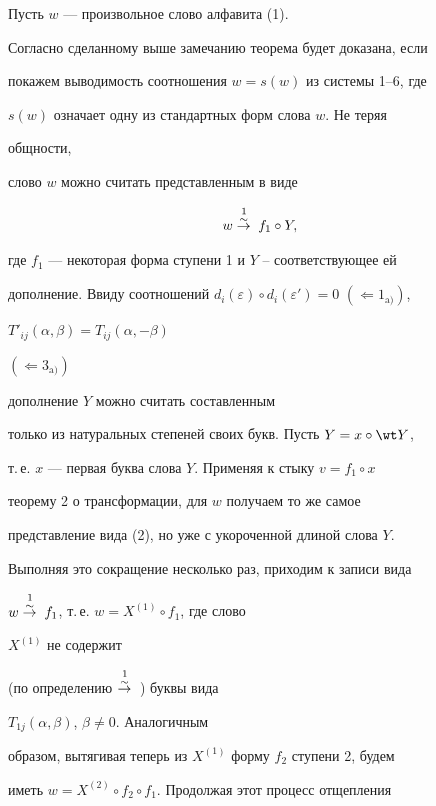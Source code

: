  


\begin{pf} 


Пусть $w$ --- произвольное слово алфавита (1). 


Согласно сделанному выше замечанию теорема будет доказана, если 


покажем выводимость соотношения $w=s(w)$ из системы 1--6, где 


$s(w)$ означает одну из стандартных форм слова $w$. Не теряя 


общности, 


слово $w$ можно считать представленным в виде 


\begin{equation} 


w\overset{1\;}{\simto}{}f_1\circ Y, 


\end{equation} 


где $f_1$ --- некоторая форма ступени 1 и $Y$ -- соответствующее ей 


дополнение. Ввиду соотношений $d_i(\varepsilon)\circ 


d_i(\varepsilon')=0$ $(\Leftarrow 1_{\mathrm a)})$, 


$T'_{ij}(\alpha,\beta)=T_{ij}(\alpha,-\beta)$ 


$(\Leftarrow 3_{\mathrm a)})$ 


дополнение $Y$ можно считать составленным 


только из натуральных степеней своих букв. Пусть $Y=x\circ\wt Y$, 


т.\,е. $x$ --- первая буква слова $Y$. Применяя к стыку $v=f_1\circ x$ 


теорему 2 о трансформации, для $w$ получаем то же самое 


представление вида (2), но уже с укороченной длиной слова $Y$. 


Выполняя это сокращение несколько раз, приходим к записи вида 


$w\overset{1\;}{\overset{\sim}{\to}{}}{}f_1$, т.\,е. $w=X^{(1)}\circ f_1$, где слово 


$X^{(1)}$ не содержит 


(по определению $\overset{1\;}{\overset{\sim}{\to}{}}{}$) буквы вида 


$T_{1j}(\alpha,\beta)$, $\beta\ne0$. Аналогичным 


образом, вытягивая теперь из $X^{(1)}$ форму $f_2$ ступени 2, будем 


иметь $w=X^{(2)}\circ f_2\circ f_1$. Продолжая этот процесс отщепления 



\end{pf}

